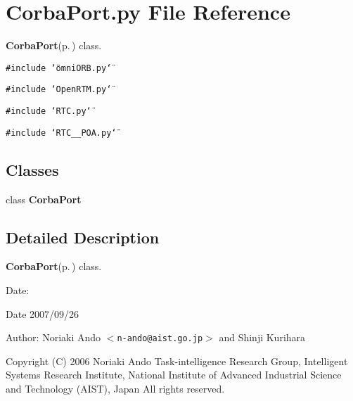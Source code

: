 \section{Corba\-Port.py File Reference}
\label{CorbaPort_8py}
{\bf Corba\-Port}{\rm (p.\,\pageref{classCorbaPort})} class. 

{\tt \#include \char`\"{}omni\-ORB.py\char`\"{}}\par
{\tt \#include \char`\"{}Open\-RTM.py\char`\"{}}\par
{\tt \#include \char`\"{}RTC.py\char`\"{}}\par
{\tt \#include \char`\"{}RTC\_\-\_\-POA.py\char`\"{}}\par
\subsection*{Classes}
\begin{CompactItemize}
\item 
class {\bf Corba\-Port}
\end{CompactItemize}


\subsection{Detailed Description}
{\bf Corba\-Port}{\rm (p.\,\pageref{classCorbaPort})} class. 

\begin{Desc}
\item[Date:]\begin{Desc}
\item[Date]2007/09/26 \end{Desc}
\end{Desc}
\begin{Desc}
\item[Author:]Noriaki Ando $<${\tt n-ando@aist.go.jp}$>$ and Shinji Kurihara\end{Desc}
Copyright (C) 2006 Noriaki Ando Task-intelligence Research Group, Intelligent Systems Research Institute, National Institute of Advanced Industrial Science and Technology (AIST), Japan All rights reserved.